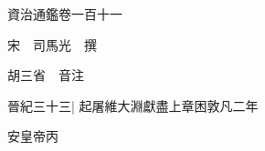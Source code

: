 






























































資治通鑑卷一百十一

宋　司馬光　撰

胡三省　音注

晉紀三十三|{
	起屠維大淵獻盡上章困敦凡二年}


安皇帝丙

